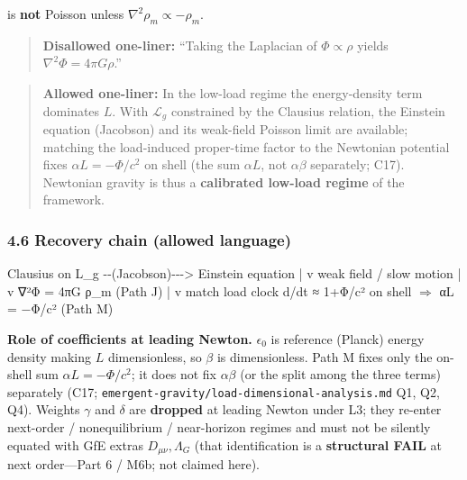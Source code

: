 \documentclass[
  11pt,
]{article}
\newenvironment{Shaded}{}{}
\newcommand{\NormalTok}[1]{#1}
\newcounter{none} %
\begin{document}
is \textbf{not} Poisson unless \(\nabla^2\rho_m\propto-\rho_m\).

\begin{quote}
\textbf{Disallowed one-liner:} ``Taking the Laplacian of
\(\Phi\propto\rho\) yields \(\nabla^2\Phi=4\pi G\rho\).''
\end{quote}

\begin{quote}
\textbf{Allowed one-liner:} In the low-load regime the energy-density
term dominates \(L\). With \(\mathcal{L}_g\) constrained by the Clausius
relation, the Einstein equation (Jacobson) and its weak-field Poisson
limit are available; matching the load-induced proper-time factor to the
Newtonian potential fixes \(\alpha L=-\Phi/c^2\) on shell (the sum \(\alpha L\), not
\(\alpha\beta\) separately; C17). Newtonian gravity
is thus a \textbf{calibrated low-load regime} of the framework.
\end{quote}

\subsubsection{4.6 Recovery chain (allowed
language)}\label{recovery-chain-allowed-language}

\begin{Shaded}
\begin{Highlighting}[]
\NormalTok{Clausius on L\_g  {-}{-}(Jacobson){-}{-}{-}\textgreater{}  Einstein equation}
\NormalTok{                                      |}
\NormalTok{                                      v}
\NormalTok{                              weak field / slow motion}
\NormalTok{                                      |}
\NormalTok{                                      v}
\NormalTok{                              ∇²Φ = 4πG ρ\_m     (Path J)}
\NormalTok{                                      |}
\NormalTok{                                      v}
\NormalTok{                    match load clock d\tau/dt ≈ 1+Φ/c²}
\NormalTok{                    on shell  $\Rightarrow$  αL = −Φ/c²      (Path M)}
\end{Highlighting}
\end{Shaded}

\textbf{Role of coefficients at leading Newton.} \(\epsilon_0\) is
reference (Planck) energy density making \(L\) dimensionless, so
\(\beta\) is dimensionless. Path M fixes only the on-shell sum
\(\alpha L=-\Phi/c^2\); it does not fix \(\alpha\beta\) (or the split
among the three terms) separately (C17;
\texttt{emergent-gravity/load-dimensional-analysis.md} Q1, Q2, Q4). Weights \(\gamma\) and \(\delta\)
are \textbf{dropped} at leading Newton under L3; they re-enter
next-order / nonequilibrium / near-horizon regimes and must not be
silently equated with GfE extras \(D_{\mu\nu},\Lambda_G\) (that
identification is a \textbf{structural FAIL} at next order---Part 6 /
M6b; not claimed here).
\end{document}
